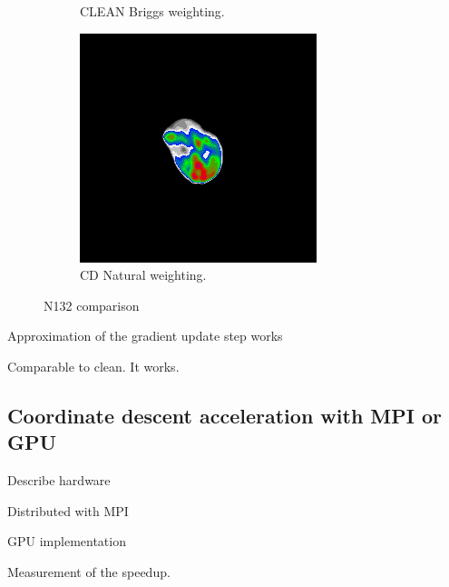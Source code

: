 \begin{figure}[h]
\begin{subfigure}[b]{0.3\linewidth}
		\caption{CLEAN Briggs weighting.}
		\label{results:N132:cleanbriggs}
	\end{subfigure}
	\begin{subfigure}[b]{0.3\linewidth}
		\includegraphics[width=1.00\linewidth]{./chapters/10.results/cleancomp/n132_cd.png}
		\caption{CD Natural weighting.}
		\label{results:comp:N132:cd}
	\end{subfigure}
	\caption{N132 comparison}
	\label{results:cleancomp::N132:figure}
\end{figure}

Approximation of the gradient update step works

Comparable to clean.
It works.


\subsection{Coordinate descent acceleration with MPI or GPU}

Describe hardware

Distributed with MPI

GPU implementation

Measurement of the speedup.

